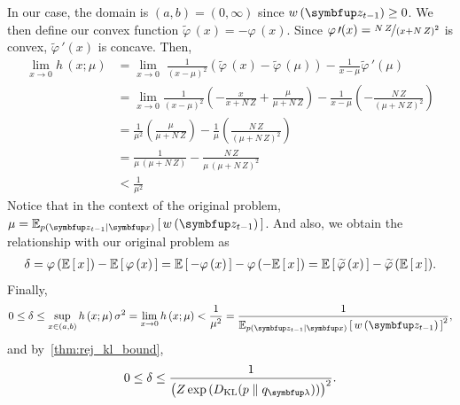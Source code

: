 \begin{proofEnd}
In our case, the domain is \((a,b) = (0, \infty)\) since \(w\,(\vz_{t-1}) \geq 0\).
We then define our convex function \(\widetilde{\varphi}\,(x) = - \varphi\,(x)\).
Since \(\varphi\,\prime(x) = \nicefrac{N\,Z}{{(x + N\,Z)}^2}\) is convex, \(\widetilde{\varphi}\,\prime(x)\) is concave. Then, 
\begin{align}
  \lim_{x \rightarrow 0} h\,(x; \mu)
  &=
  \lim_{x \rightarrow 0} \; \frac{1}{{(x - \mu)}^2} \left( \widetilde{\varphi}\,(x) - \widetilde{\varphi}\,(\mu) \right)
  - \frac{1}{ x - \mu }  \widetilde{\varphi}\,\prime(\mu)  \\
  &=
  \lim_{x \rightarrow 0} \frac{1}{{(x - \mu)}^2}
  \left(
  - \frac{x}{x + N\,Z} + \frac{\mu}{\mu + N\,Z}
  \right)
  -
  \frac{1}{x - \mu}
  \left(
  - \frac{N\,Z}{ {(\mu + N\,Z)}^2 }
  \right) \\
  &= \frac{1}{\mu^2} \left( \frac{\mu}{\mu + N\,Z} \right)
  - \frac{1}{\mu} \left( \frac{N\,Z}{{(\mu + N\,Z)}^2} \right) \\
  &= \frac{1}{ \mu \, (\mu + N\,Z) }
  - \frac{N\,Z}{ \mu \, {(\mu + N\,Z)}^2} \\
  &< \frac{1}{\mu^2}
\end{align}
Notice that in the context of the original problem, \(\mu = \Esub{p(\vz_{t-1}\mid\vx)}{ w\,(\vz_{t-1}) }\).
And also, we obtain the relationship with our original problem as
\begin{align}
  \delta
  = \varphi\,(\mathbb{E}\left[\,x\,\right]) - \mathbb{E}\left[\,\varphi\,(x)\,\right]
  = \mathbb{E}\left[\,-\varphi\,(x)\,\right] - \varphi\,(-\mathbb{E}\left[\,x\,\right])
  = \mathbb{E}\left[\,\widetilde{\varphi}\,(x)\,\right] - \widetilde{\varphi}\,(\mathbb{E}\left[\,x\,\right]).
\end{align}
Finally,
\begin{align}
  0 \leq \delta
  \leq \sup_{x \in (a,b)} h\,(x; \mu) \, \sigma^2
  = \lim_{x \rightarrow 0} h\,(x; \mu) 
  < \frac{1}{\mu^2}
  = \frac{1}{ {\Esub{p(\vz_{t-1}\mid\vx)}{ w\,(\vz_{t-1}) }}^2 },
\end{align}
and by~\cref{thm:rej_kl_bound},
\begin{equation}
  0 \leq \delta \leq \frac{1}{ {\big( Z \exp\,( \DKL{p}{q_{\vlambda}} ) \big)}^2 }.
\end{equation}
\end{proofEnd}


